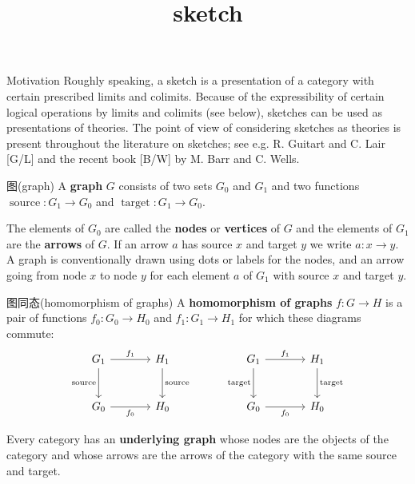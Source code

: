 \documentclass{beamer}
\title{sketch}
\date{}
\begin{document}
\begin{frame}
    \titlepage
\end{frame}

\begin{frame}{Motivation\cite{makkai_pare}}
Roughly speaking, a sketch is a presentation of a category with certain prescribed limits and colimits. Because of the expressibility of certain logical operations by limits and colimits (see below), sketches can be used as presentations of theories. The point of view of considering sketches as theories is present throughout the literature on sketches; see e.g. R. Guitart and C. Lair [G/L] and the recent book [B/W] by M. Barr and C. Wells.
\end{frame}

\begin{frame}{图(graph)}
A \textbf{graph} $G$ consists of two sets $G_0$ and $G_1$ and two functions $\operatorname{source}\colon G_1 \to G_0$ and $\operatorname{target}\colon G_1 \to G_0$.

\vspace{6mm}

The elements of $G_0$ are called the \textbf{nodes} or \textbf{vertices} of $G$ and the elements of $G_1$ are the \textbf{arrows} of $G$. If an arrow $a$ has source $x$ and target $y$ we write $a\colon x \to y$. A graph is conventionally drawn using dots or labels for the nodes, and an arrow going from node $x$ to node $y$ for each element $a$ of $G_1$ with source $x$ and target $y$.
\end{frame}

\begin{frame}[fragile]{图同态(homomorphism of graphs)}
A \textbf{homomorphism of graphs} $f\colon G \to H$ is a pair of functions $f_0\colon G_0 \to H_0$ and $f_1\colon G_1 \to H_1$ for which these diagrams commute:
\[
\begin{tikzcd}[column sep=large,row sep=large]
G_1 \arrow[r,"f_1"] \arrow[d,"\operatorname{source}"'] & H_1 \arrow[d,"\operatorname{source}"] \\
G_0 \arrow[r,"f_0"'] & H_0
\end{tikzcd}
\qquad\quad
\begin{tikzcd}[column sep=large,row sep=large]
G_1 \arrow[r,"f_1"] \arrow[d,"\operatorname{target}"'] & H_1 \arrow[d,"\operatorname{target}"] \\
G_0 \arrow[r,"f_0"'] & H_0
\end{tikzcd}
\]

\vspace{5mm}

Every category has an \textbf{underlying graph} whose nodes are the objects of the category and whose arrows are the arrows of the category with the same source and target.
\end{frame}
\end{document}
